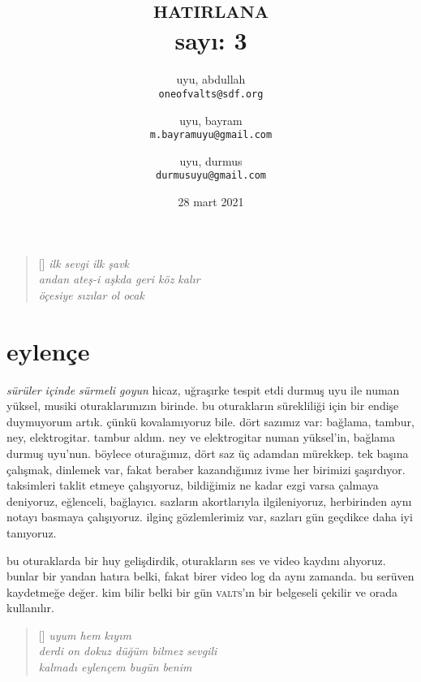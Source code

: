 \documentclass[a4paper, twocolumn]{memoir}
\author{
  uyu, abdullah\\
  \texttt{oneofvalts@sdf.org}
  \and
  uyu, bayram\\
  \texttt{m.bayramuyu@gmail.com}
  \and
  uyu, durmus\\
  \texttt{durmusuyu@gmail.com}
}
\title{\textsc{hatirlana}\\\small sayı: 3}
\date{28 mart 2021}
\begin{document}
\maketitle
\begin{verse}[\versewidth]
  \itshape{}
  ilk sevgi ilk şavk\\
  andan ateş-i aşkda geri köz kalır\\
  öçesiye sızılar ol ocak
\end{verse}
\section{eylençe}
\textit{sürüler içinde sürmeli goyun} hicaz, uğraşırke tespit etdi durmuş
uyu ile numan yüksel, musiki oturaklarımızın birinde. bu oturakların
sürekliliği için bir endişe duymuyorum artık. çünkü kovalamıyoruz bile.
dört sazımız var: bağlama, tambur, ney, elektrogitar. tambur aldım. ney
ve elektrogitar numan yüksel'in, bağlama durmuş uyu'nun. böylece
oturağımız, dört saz üç adamdan mürekkep. tek başına çalışmak, dinlemek
var, fakat beraber kazandığımız ivme her birimizi şaşırdıyor. taksimleri
taklit etmeye çalışıyoruz, bildiğimiz ne kadar ezgi varsa çalmaya
deniyoruz, eğlenceli, bağlayıcı. sazların akortlarıyla ilgileniyoruz,
herbirinden aynı notayı basmaya çalışıyoruz. ilginç gözlemlerimiz var,
sazları gün geçdikce daha iyi tanıyoruz.

bu oturaklarda bir huy gelişdirdik, oturakların ses ve video
kaydını alıyoruz. bunlar bir yandan hatıra belki, fakat birer video log da
aynı zamanda. bu serüven kaydetmeğe değer. kim bilir belki bir gün
\textsc{valts}'ın bir belgeseli çekilir ve orada kullanılır.
\begin{verse}[\versewidth]
  \itshape{}
  uyum hem kıyım\\
  derdi on dokuz düğüm bilmez sevgili\\
  kalmadı eylençem bugün benim
\end{verse}
\end{document}
